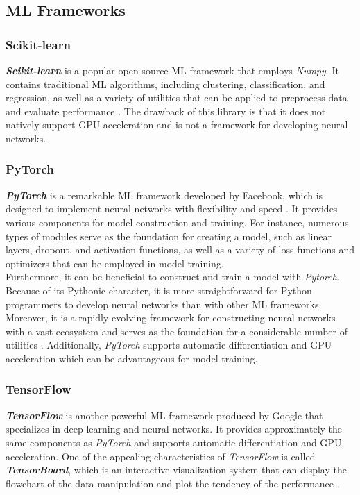 \documentclass[12pt,twoside]{report}
\begin{document}
\subsection{ML Frameworks}
\subsubsection{Scikit-learn}
\textit{\textbf{Scikit-learn}} is a popular open-source ML framework that employs \textit{Numpy}. It contains traditional ML algorithms, including clustering, classification, and regression, as well as a variety of utilities that can be applied to preprocess data and evaluate performance \citep{RN7}. The drawback of this library is that it does not natively support GPU acceleration and is not a framework for developing neural networks. 

\subsubsection{PyTorch}
\textbf{\textit{PyTorch}} is a remarkable ML framework developed by Facebook, which is designed to implement neural networks with flexibility and speed \citep{RN5}. It provides various components for model construction and training. For instance, numerous types of modules serve as the foundation for creating a model, such as linear layers, dropout, and activation functions, as well as a variety of loss functions and optimizers that can be employed in model training. 
\\

Furthermore, it can be beneficial to construct and train a model with \textit{Pytorch}. Because of its Pythonic character, it is more straightforward for Python programmers to develop neural networks than with other ML frameworks. Moreover, it is a rapidly evolving framework for constructing neural networks with a vast ecosystem and serves as the foundation for a considerable number of utilities \citep{RN5}. Additionally, \textit{PyTorch} supports automatic differentiation and GPU acceleration which can be advantageous for model training.

\subsubsection{TensorFlow}
\textit{\textbf{TensorFlow}} is another powerful ML framework produced by Google that specializes in deep learning and neural networks. It provides approximately the same components as \textit{PyTorch} and  supports automatic differentiation and GPU acceleration. One of the appealing characteristics of \textit{TensorFlow} is called \textit{\textbf{TensorBoard}}, which is an interactive visualization system that can display the flowchart of the data manipulation and plot the tendency of the performance \citep{RN15}. 
\end{document}
